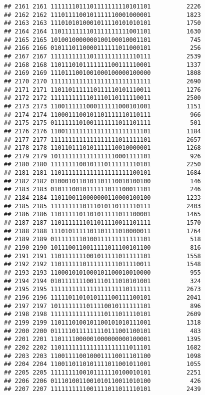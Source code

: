 \documentclass[]{article}
\begin{document}
\begin{verbatim}
## 2161 2161 1111111011101111111110101101          2226
## 2162 2162 1110111100101111110001000001          1823
## 2163 2163 1110101010001011110101010101          1750
## 2164 2164 1101111111101111111111001101          1630
## 2165 2165 1010010000000100100010001101           745
## 2166 2166 0101110110000111111011000101           256
## 2167 2167 1111111111101111111111110111          2539
## 2168 2168 1101110101111111100111110001          1337
## 2169 2169 1110111001001000100000100000          1808
## 2170 2170 1111111111111111111111111111          2690
## 2171 2171 1101101111110111110101110011          1276
## 2172 2172 1111111111101110110111110011          2500
## 2173 2173 1100111111000111111000101001          1151
## 2174 2174 1100011100101101111110110111           966
## 2175 2175 0111111101001111111011101111           501
## 2176 2176 1100111111111111111111111101          1184
## 2177 2177 1111111111111111111011111101          2657
## 2178 2178 1101101110101111110010000001          1268
## 2179 2179 1011111111111111110001111101           926
## 2180 2180 1111111100101110111111110101          2250
## 2181 2181 1101111111111111111111100101          1684
## 2182 2182 0100010110101101110010100100           146
## 2183 2183 0101110010111111011100011101           246
## 2184 2184 1101100110000000110000100100          1233
## 2185 2185 1111111110111010110111110111          2403
## 2186 2186 1101111101101011111011100001          1465
## 2187 2187 1101111111011011110011101111          1570
## 2188 2188 1110101111101101111010000011          1764
## 2189 2189 0111111110100111111111111101           518
## 2190 2190 1011100110011111011100101100           816
## 2191 2191 1101111111001011111011111101          1558
## 2192 2192 1101111110111111111011110011          1548
## 2193 2193 1100010101000101100010010000           955
## 2194 2194 0101111111001110111010101001           324
## 2195 2195 1111111111111111111110111111          2673
## 2196 2196 1111101101010111100111100101          2041
## 2197 2197 1011111111011110010111111101           896
## 2198 2198 1111111111111110111011110101          2609
## 2199 2199 1101110100101100101010111001          1318
## 2200 2200 0111110111111110111001100101           483
## 2201 2201 1101111000001000000000100001          1395
## 2202 2202 1101111111111111111111011101          1682
## 2203 2203 1100111100100011110011101100          1098
## 2204 2204 1100110110101111011001011001          1055
## 2205 2205 1111111100101111110100010101          2251
## 2206 2206 0111010011001010110011010100           426
## 2207 2207 1111111111001111011011110101          2439

\end{verbatim}
\end{document}
